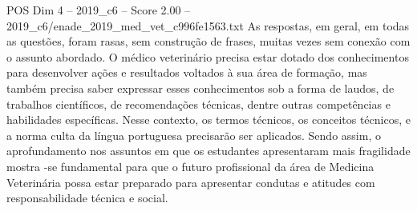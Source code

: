 \begin{textsample}{POS Dim 4 – 2019\_c6 – Score 2.00 – 2019\_c6/enade\_2019\_med\_vet\_c996fe1563.txt}
As respostas, em geral, em todas as questões, foram rasas, sem construção de frases, muitas vezes sem conexão com o assunto abordado.
O médico veterinário precisa estar dotado dos conhecimentos para desenvolver ações e resultados voltados à sua área de formação, mas também precisa saber expressar esses conhecimentos sob a forma de laudos, de trabalhos científicos, de recomendações técnicas, dentre outras competências e habilidades específicas.
Nesse contexto, os termos técnicos, os conceitos técnicos, e a norma culta da língua portuguesa precisarão ser aplicados.
Sendo assim, o aprofundamento nos assuntos em que os estudantes apresentaram mais fragilidade mostra -se fundamental para que o futuro profissional da área de Medicina Veterinária possa estar preparado para apresentar condutas e atitudes com responsabilidade técnica e social.

\end{textsample}
